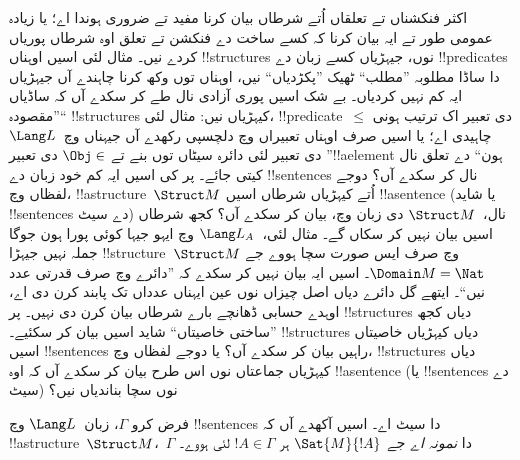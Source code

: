 \documentclass[../../../include/open-logic-section]{subfiles}
\begin{document}


\begin{explain}
اکثر فنکشناں تے تعلقاں اُتے شرطاں بیان کرنا مفید تے ضروری ہوندا
اے؛ یا زیادہ عمومی طور تے ایہ بیان کرنا کہ کسے ساخت دے فنکشن
تے تعلق اوہ شرطاں پوریاں کردے نیں۔ مثال لئی اسیں اوہناں
!!{structure}s نوں، جیہڑیاں کسے زبان دے !!{predicate}s دا
ساڈا مطلوبہ ”مطلب“ ٹھیک ”پکڑدیاں“ نیں، اوہناں توں وکھ کرنا
چاہندے آں جیہڑیاں ایہ کم نہیں کردیاں۔ بے شک اسیں پوری آزادی
نال طے کر سکدے آں کہ ساڈیاں ”مقصودہ“ !!{structure}s کیہڑیاں
نیں: مثال لئی، !!{predicate}~$\le$ دی تعبیر اک ترتیب ہونی
چاہیدی اے؛ یا اسیں صرف اوہناں تعبیراں وچ دلچسپی
رکھدے آں جیہناں وچ~$\Lang L$ دی تعبیر لئی دائرہ سیٹاں توں
بنے تے $\Obj \in$ دی تعبیر ”!!a{element} ہون“ دے تعلق نال
کیتی جائے۔ پر کی اسیں ایہ کم خود زبان دے !!{sentence}s نال
کر سکدے آں؟ دوجے لفظاں وچ، !!a{structure}~$\Struct M$ اُتے
کیہڑیاں شرطاں اسیں !!a{sentence} (یا شاید
!!{sentence}s دے سیٹ) نال،~$\Struct M$ دی زبان وچ، بیان کر سکدے آں؟ کجھ شرطاں اسیں
بیان نہیں کر سکاں گے۔ مثال لئی،~$\Lang L_A$ وچ ایہو جیہا
کوئی پورا ہون جوگا جملہ نہیں جیہڑا !!{structure}~$\Struct M$ وچ صرف ایس
صورت سچا ہووے جے $\Domain M = \Nat$۔ اسیں ایہ بیان نہیں کر
سکدے کہ ”دائرے وچ صرف قدرتی عدد نیں“۔ ایتھے گل دائرے دیاں
اصل چیزاں نوں عین ایہناں عدداں تک پابند کرن دی اے، اوہدے
حسابی ڈھانچے بارے شرطاں بیان کرن دی نہیں۔ پر !!{structure}s دیاں
کجھ ”ساختی خاصیتاں“ شاید اسیں بیان کر سکئیے۔ !!{structure}s
دیاں کیہڑیاں خاصیتاں اسیں !!{sentence}s راہیں بیان کر سکدے آں؟
یا دوجے لفظاں وچ، !!{structure}s دیاں کیہڑیاں جماعتاں نوں
اس طرح بیان کر سکدے آں کہ اوہ !!a{sentence} (یا
!!{sentence}s دے سیٹ) نوں سچا بناندیاں نیں؟
\end{explain}

\begin{defn}
فرض کرو $\Gamma$، زبان~$\Lang L$ وچ !!{sentence}s دا سیٹ
اے۔ اسیں آکھدے آں کہ !!a{structure}~$\Struct M$،~$\Gamma$
دا \emph{نمونہ اے} جے $\Sat{M}{!A}$ ہر $!A \in \Gamma$ لئی ہووے۔
\end{defn}
\end{document}
